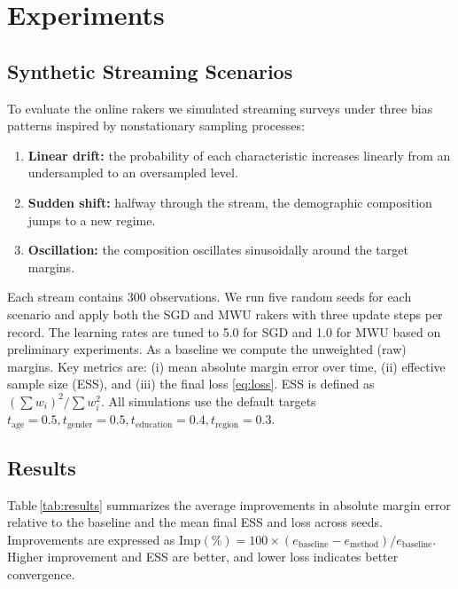 \documentclass[12pt, letterpaper]{article}
\begin{document}
\section{Experiments}
\label{sec:experiments}

\subsection{Synthetic Streaming Scenarios}

To evaluate the online rakers we simulated streaming surveys under
three bias patterns inspired by nonstationary sampling processes:
\begin{enumerate}
  \item \textbf{Linear drift:} the probability of each characteristic
    increases linearly from an undersampled to an oversampled level.
  \item \textbf{Sudden shift:} halfway through the stream, the
    demographic composition jumps to a new regime.
  \item \textbf{Oscillation:} the composition oscillates sinusoidally
    around the target margins.
\end{enumerate}
Each stream contains 300 observations.  We run five random seeds for
each scenario and apply both the SGD and MWU rakers with three
update steps per record.  The learning rates are tuned to 5.0 for
SGD and 1.0 for MWU based on preliminary experiments.  As a baseline
we compute the unweighted (raw) margins.  Key metrics are: (i) mean
absolute margin error over time, (ii) effective sample size (ESS), and
(iii) the final loss \eqref{eq:loss}.  ESS is defined as
\( (\sum w_i)^2 / \sum w_i^2\).  All simulations use the default
targets \(t_{\mathrm{age}}=0.5, t_{\mathrm{gender}}=0.5, t_{\mathrm{education}}=0.4,
t_{\mathrm{region}}=0.3\).

\subsection{Results}

Table\,\ref{tab:results} summarizes the average improvements in
absolute margin error relative to the baseline and the mean final
ESS and loss across seeds.  Improvements are expressed as
\(\text{Imp}(\%) = 100\times (e_{\mathrm{baseline}} - e_{\mathrm{method}})/e_{\mathrm{baseline}}\).  Higher
improvement and ESS are better, and lower loss indicates better
convergence.
\end{document}
